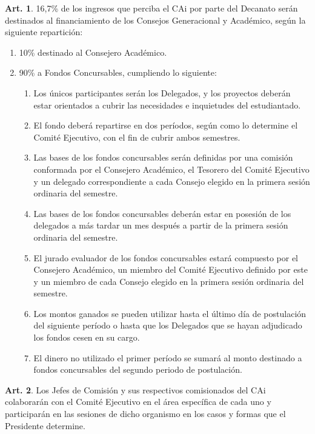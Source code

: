 \documentclass[letterpaper,11pt]{article}
\theoremstyle{definition}%
\newtheorem{art}{Art.} %
\begin{document}
\begin{art}
	16,7\% de los ingresos que perciba el CAi por parte del Decanato serán destinados al financiamiento de los Consejos Generacional y Académico, según la siguiente repartición:
	\begin{enumerate}
		\item 10\% destinado al Consejero Académico.
		\item 90\% a Fondos Concursables, cumpliendo lo siguiente:
		      \begin{enumerate}
			      \item Los únicos participantes serán los Delegados, y los proyectos deberán estar orientados a cubrir las necesidades e inquietudes del estudiantado.
			      \item El fondo deberá repartirse en dos períodos, según como lo determine el Comité Ejecutivo, con el fin de cubrir ambos semestres.
			      \item Las bases de los fondos concursables serán definidas por una comisión conformada por el Consejero Académico, el Tesorero del Comité Ejecutivo y un delegado correspondiente  a cada Consejo elegido en la primera sesión ordinaria del semestre.
			      \item Las bases de los fondos concursables deberán estar en posesión de los delegados a más tardar un mes después a partir de la primera sesión ordinaria del semestre.
			      \item El jurado evaluador de los fondos concursables estará compuesto por el Consejero Académico, un miembro del Comité Ejecutivo definido por este y un  miembro de cada Consejo elegido en la primera sesión ordinaria del semestre.
			      \item Los montos ganados se pueden utilizar hasta el último día de postulación del siguiente período o hasta que los Delegados que se hayan adjudicado los fondos cesen en su cargo.
			      \item El dinero no utilizado el primer período se sumará al monto destinado a fondos concursables del segundo periodo de postulación.
		      \end{enumerate}
	\end{enumerate}
\end{art}

\begin{art}
	Los Jefes de Comisión y sus respectivos comisionados del CAi colaborarán con el Comité Ejecutivo en el área específica de cada uno y participarán en las sesiones de dicho organismo en los casos y formas que el Presidente determine.
\end{art}
\end{document}
